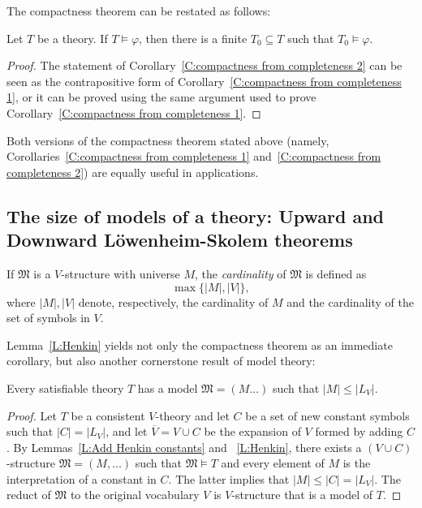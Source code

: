 \documentclass{scrartcl}
\renewcommand{\phi}{\varphi}
\newcommand{\FM}{\mathfrak{M}}
\begin{document}
The compactness theorem can be restated as follows:

\begin{corollary}
\label{C:compactness from completeness 2}
Let $T$ be a theory. If $T\models\phi$, then there is a finite $T_0\subseteq T$ such that $T_0\models\phi$.
\end{corollary}

\begin{proof}
The statement of Corollary~\ref{C:compactness from completeness 2} can be seen as the contrapositive form of Corollary~\ref{C:compactness from completeness 1}, or it can be proved using the same argument used to prove Corollary~\ref{C:compactness from completeness 1}.
\end{proof}

Both versions of the compactness theorem stated above (namely, Corollaries~\ref{C:compactness from completeness 1} and~\ref{C:compactness from completeness 2}) are equally useful in applications. 

\subsection{The size of models of a theory: Upward and Downward Löwenheim-Skolem theorems}

\begin{definition}
If $\FM$ is a $V$-structure with universe $M$, the \emph{cardinality} of $\FM$ is defined as 
\[
\max\{|M|,|V|\},
\]
where $|M|,|V|$ denote, respectively, the cardinality of $M$ and the cardinality of the set of symbols in $V$.
\end{definition}

Lemma~\ref{L:Henkin} yields not only the compactness theorem as an immediate corollary, but also another cornerstone result of model theory:

\begin{theorem}
\label{T:Downward L-S}
Every satisfiable theory $T$ has a model $\FM=(M\dots)$ such that $|M|\le|L_V|$. 
\end{theorem}

\begin{proof}
Let $T$ be a consistent $V$-theory and let $C$ be a set of new constant symbols such that $|C| = |L_V|$, and let $\overline{V} = V\cup C$ be the expansion of $V$ formed by adding $C$. By Lemmas~\ref{L:Add Henkin constants} and ~\ref{L:Henkin}, there exists a $(V\cup C)$-structure $\FM=(M,\dots)$ such that $\FM\models T$ and every element of $M$ is the interpretation of a constant in $C$. The latter implies that $|M|\leq |C|=|L_V|$. The reduct of $\FM$ to the original vocabulary $V$ is $V$-structure that is a model of $T$.
\end{proof}
\end{document}
